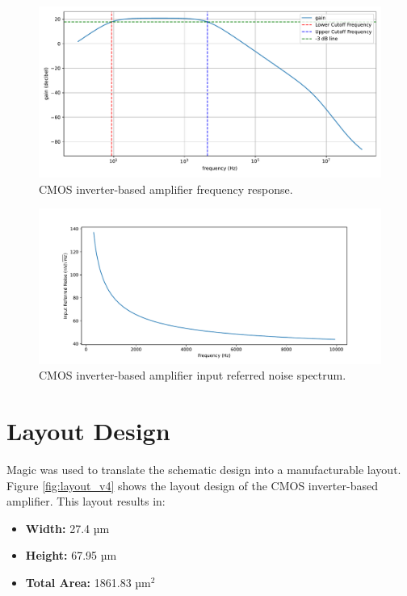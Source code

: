 \begin{figure}[ht!]
\centering
\includegraphics[width=\textwidth]{Figures/test.pdf}
\caption{CMOS inverter-based amplifier frequency response.}
\label{fig:frequency_response_v4}
\end{figure}

\begin{figure}[ht!]
\centering
\includegraphics[width=\textwidth]{Figures/inoise_v4.pdf}
\caption{CMOS inverter-based amplifier input referred noise spectrum.}
\label{fig:noise_v4}
\end{figure}

\section{Layout Design}

Magic was used to translate the schematic design into a manufacturable layout. 
Figure \ref{fig:layout_v4} shows the layout design of the CMOS inverter-based amplifier. This layout results in:

\begin{itemize}
\item \textbf{Width:} 27.4 µm
\item \textbf{Height:} 67.95 µm
\item \textbf{Total Area:} 1861.83 µm$^2$
\end{itemize}

